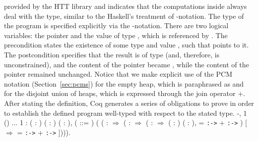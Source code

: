 provided by the HTT library and indicates that the computations inside
always deal with the  type, similar to the Haskell's treatment
of -notation.
The type of the program  is specified explicitly via the
-notation. There are two logical variables: the pointer  and
the value  of type , which is referenced by . The
precondition states the existence of some type  and value , such
that  points to it. The postcondition specifies that the result is
of type  (and, therefore, is unconstrained), and the content of
the pointer  became , while the content of the pointer 
remained unchanged. Notice that we make explicit use of the PCM
notation (Section~\ref{sec:pcms}) for the empty heap, which is
paraphrased as  and for the disjoint union of heaps, which is
expressed through the join operator +.
After stating the definition, Coq generates a series of obligations to
prove in order to establish the defined program well-typed with
respect to the stated type.
\coqdoceol
\coqdocemptyline
\coqdocnoindent
{}  -,  1 ()\coqdoceol
\coqdocnoindent
{}  ...\coqdoceol
{}  \coqdoceol
\coqdocnoindent
{} 1  :\coqdoceol
\coqdocnoindent
\coqdockw{\ensuremath{\forall}} ( : ) ( : ) ( : ),\coqdoceol
\coqdocnoindent
{} ( ::= )\coqdoceol
\coqdocindent{1.00em}
(\coqdoceol
\coqdocindent{2.50em}
(  :  \ensuremath{\Rightarrow}\coqdoceol
\coqdocindent{3.00em}
\coqdoceol
\coqdocindent{4.00em}
(  :  \ensuremath{\Rightarrow}\coqdoceol
\coqdocindent{4.50em}
\coqdoceol
\coqdocindent{5.50em}
(  :  \ensuremath{\Rightarrow}  ( : ) ( : ),  =  \texttt{:->}  +  \texttt{:->} )\coqdoceol
\coqdocindent{5.50em}
[ \coqdocvar{\_}  \ensuremath{\Rightarrow}  =  \texttt{:->}  +  \texttt{:->} ]))).

